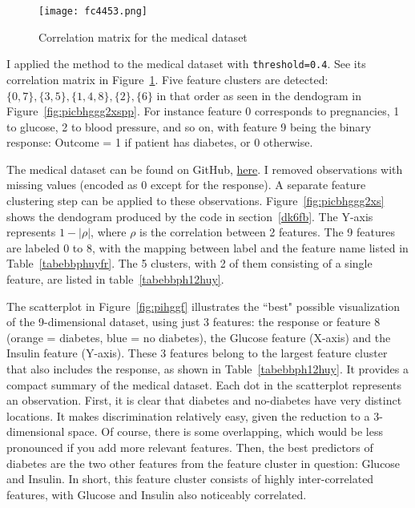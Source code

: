 \documentclass[oneside,10pt]{book}
\begin{document}
\begin{figure}[H]
\centering
\texttt{[image: fc4453.png]}  
\caption{Correlation matrix for the medical dataset}
\label{fig:pihg}
\end{figure}

I applied the method to the medical dataset with \texttt{threshold=0.4}. See its  correlation matrix in Figure~\ref{fig:pihg}.
 Five feature clusters are
 detected: $\{0, 7\}, \{3, 5\}, \{1, 4, 8\}, \{2\}, \{6\}$ 
   in that order as seen in the dendogram in Figure~\ref{fig:picbhggg2xspp}.
For instance feature 0 corresponds to pregnancies, 1 to glucose, 2 to blood pressure, and so on,
 with feature 9 being the binary response: Outcome = 1 if patient has diabetes, or 0 otherwise. 



 



The medical dataset can be found on GitHub, \href{https://github.com/VincentGranville/Main/blob/main/diabetes.csv}{here}. I removed observations with missing values (encoded as 0 except for the response). A separate feature clustering step can be applied to these observations. Figure~\ref{fig:picbhggg2xs} shows the dendogram produced by the code in section~\ref{dk6fb}. The Y-axis 
 represents $1-|\rho|$, where $\rho$ is the correlation between 2 features. The 9 features are labeled 
 0 to 8, with the mapping between label and the feature name listed in Table~\ref{tabebbphuyfr}. The 5 clusters, with 2 of them consisting of a single feature, are listed in table~\ref{tabebbph12huy}. 



The scatterplot in Figure~\ref{fig:pihggf} illustrates the ``best" possible visualization of the 9-dimensional dataset, using just 3 features:
  the response or feature 8  (orange = diabetes, blue = no diabetes), the Glucose feature (X-axis) and the Insulin feature (Y-axis). 
 These 3 features belong to the largest feature cluster that also includes the response, as shown in Table~\ref{tabebbph12huy}.
 It provides a compact summary of the medical dataset. Each dot in the scatterplot represents an observation. 
 First, it is clear that diabetes and no-diabetes have very distinct locations. It makes discrimination relatively easy, given the reduction to a
 3-dimensional space. Of course, there is some overlapping, which would be less pronounced if you add more relevant features.
Then, the best predictors of diabetes are the two other features from the feature cluster in question: Glucose and Insulin.
In short, this feature cluster consists of highly inter-correlated features, with Glucose and Insulin also noticeably correlated. 
\end{document}
